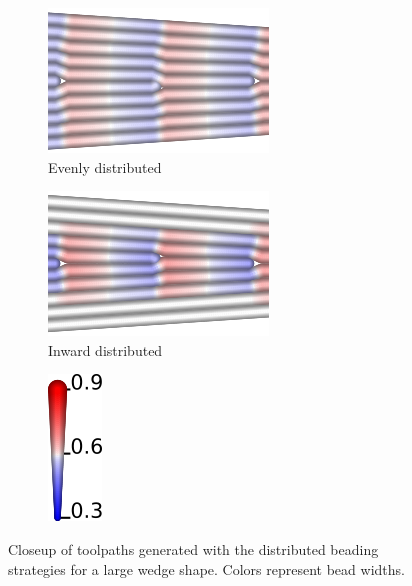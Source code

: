 \begin{figure}
\centering
\setlength{\figwidth}{.4\columnwidth}
\setlength{\figheight}{.25\columnwidth}
\begin{subfigure}{\figwidth}\centering
\includegraphics[height=\figheight]{sources/validation/wedge_Distributed_pretty_evenly.png}
\caption{Evenly distributed}
\end{subfigure}
\begin{subfigure}{\figwidth}\centering
\includegraphics[height=\figheight]{sources/validation/wedge_Distributed_pretty_inward.png}
\caption{Inward distributed}
\end{subfigure}
\begin{subfigure}{.1\columnwidth}\centering
\includegraphics[height=\figheight]{sources/validation/wedge_Distributed_pretty_legend.png}
\end{subfigure}
\caption{
Closeup of toolpaths generated with the distributed beading strategies for a large wedge shape.
Colors represent bead widths.
}
\label{distributed_comparison}
\end{figure}





